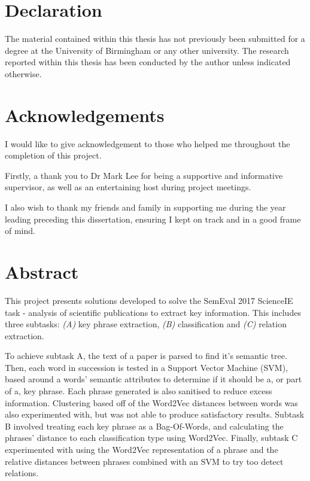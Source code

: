 \documentclass[a4paper]{report}
\begin{document}

\section*{Declaration}
The material contained within this thesis has not previously been submitted for a degree at the University of Birmingham or any other university. The research reported within this thesis has been conducted by the author unless indicated otherwise.

\pagebreak

\section*{Acknowledgements}
I would like to give acknowledgement to those who helped me throughout the completion of this project.

Firstly, a thank you to Dr Mark Lee for being a supportive and informative supervisor, as well as an entertaining host during project meetings.

I also wish to thank my friends and family in supporting me during the year leading preceding this dissertation, ensuring I kept on track and in a good frame of mind.

\pagebreak

\section*{Abstract}
This project presents solutions developed to solve the SemEval 2017 ScienceIE task - analysis of scientific publications to extract key information. This includes three subtasks: \textit{(A)} key phrase extraction, \textit{(B)} classification and \textit{(C)} relation extraction.

To achieve subtask A, the text of a paper is parsed to find it's semantic tree. Then, each word in succession is tested in a Support Vector Machine (SVM), based around a words' semantic attributes to determine if it should be a, or part of a, key phrase. Each phrase generated is also sanitised to reduce excess information. Clustering based off of the Word2Vec distances between words was also experimented with, but was not able to produce satisfactory results. Subtask B involved treating each key phrase as a Bag-Of-Words, and calculating the phrases' distance to each classification type using Word2Vec. Finally, subtask C experimented with using the Word2Vec representation of a phrase and the relative distances between phrases combined with an SVM to try too detect relations.
\end{document}
